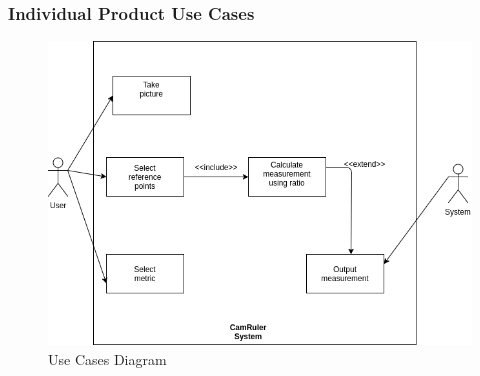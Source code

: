 \documentclass[12pt, titlepage]{article}
\begin{document}
\subsubsection{Individual Product Use Cases}
\begin{figure}[H]
   \centering
   \includegraphics[width=6in]{use_cases.png} 
   \caption{Use Cases Diagram}
   \label{fig:2}
\end{figure}
\end{document}
